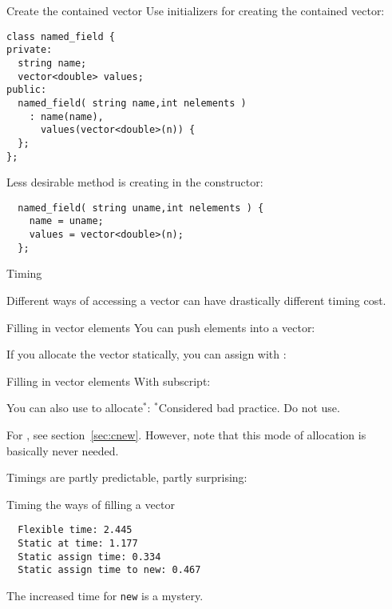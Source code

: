 \begin{block}{Create the contained vector}
  \label{sl:class-has-vector}
  Use initializers for creating the contained vector:
  \lstset{style=snippetcode}
\begin{lstlisting}
class named_field {
private:
  string name;
  vector<double> values;
public:
  named_field( string name,int nelements )
    : name(name),
      values(vector<double>(n)) {
  };
};
\end{lstlisting}

Less desirable method is creating in the constructor:
\begin{lstlisting}
  named_field( string uname,int nelements ) {
    name = uname;
    values = vector<double>(n);
  };
\end{lstlisting}
\end{block}

 {Timing}

Different ways of accessing a vector can have drastically different
timing cost.

\begin{block}{Filling in vector elements}
  \label{sl:vect-extend-code}
  You can push elements into a vector:

  If you allocate the vector statically, you can assign with :
\end{block}

\begin{block}{Filling in vector elements}
  \label{sl:vect-extend-code2}
  With subscript:

  You can also use  to allocate$^*$:
  $^*$Considered bad practice. Do not use.
\end{block}

For , see section~\ref{sec:cnew}. However, note that
this mode of allocation is basically never needed.

Timings are partly predictable, partly surprising:
\begin{block}{Timing the ways of filling a vector}
  \label{sl:vector-extend-time}
\begin{lstlisting}
  Flexible time: 2.445
  Static at time: 1.177
  Static assign time: 0.334
  Static assign time to new: 0.467
\end{lstlisting}
\end{block}

The increased time for \lstinline{new} is a mystery.

